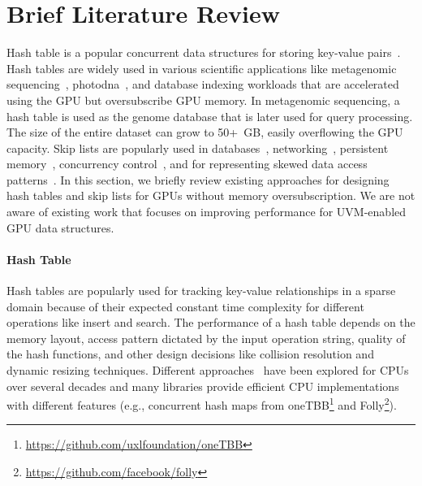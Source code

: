 \documentclass[12pt,a4paper]{article}
\begin{document}
\section*{Brief Literature Review}

Hash table is a popular concurrent data structures for storing key-value
pairs~\cite{art-of-multiprocessor-programming}. Hash tables are widely used in
various scientific applications like metagenomic
sequencing~\cite{metacache-icpp-2021}, photodna~\cite{photodna-ares-2023}, and
database indexing workloads that are accelerated using the GPU but oversubscribe
GPU memory. In metagenomic sequencing, a hash table is used as the genome
database that is later used for query processing. The size of the entire dataset
can grow to 50+~GB, easily overflowing the GPU capacity. Skip lists are
popularly used in
databases~\cite{rocksdb-meta-2012,leveldb-google-2011,pebblesdb-sosp-2017},
networking~\cite{deterministic-skiplists-soda-1992}, persistent
memory~\cite{listdb-osdi-2022,phast-tpds-2022}, concurrency
control~\cite{kiwi-ppopp-2017,nitro-vldbe-2016,jellyfish-middleware-2020}, and
for representing skewed data access
patterns~\cite{biased-skiplist-algorithm-2001,biased-skiplist-algorithmica-2005}.
In this section, we briefly review existing approaches for designing hash tables and skip lists for GPUs without memory oversubscription. We are not aware of existing work that focuses on improving performance for UVM-enabled GPU data structures.

\paragraph*{Hash Table}

Hash tables are popularly used for tracking key-value relationships in a
sparse domain because of their expected constant time complexity for
different operations like insert and search. The performance of a hash
table depends on the memory layout, access pattern dictated by the input
operation string, quality of the hash functions, and other design decisions
like collision resolution and dynamic resizing techniques. Different
approaches~\cite{art-of-multiprocessor-programming-v2,hashtable-survey-cpu} have been explored for CPUs over several decades and
many libraries provide efficient CPU implementations with different features
(e.g., concurrent hash maps from \textsf{oneTBB}\footnote{\url{https://github.com/uxlfoundation/oneTBB}} and \textsf{Folly}\footnote{\url{https://github.com/facebook/folly}}).
\end{document}
